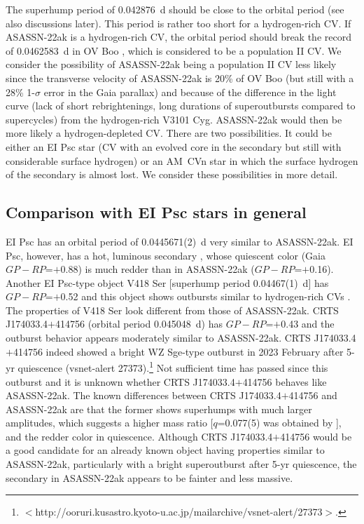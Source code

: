 \documentclass{article}
\begin{document}
   The superhump period of 0.042876~d should be close to
the orbital period (see also discussions later).
This period is rather too short for a hydrogen-rich CV.
If ASASSN-22ak is a hydrogen-rich CV,
the orbital period should break the record of 0.0462583~d
in OV Boo \citep{lit07j1507,pat08j1507,uth11j1507,ohn19ovboo},
which is considered to be a population II CV.
We consider the possibility of ASASSN-22ak being
a population II CV less likely since the transverse velocity
of ASASSN-22ak is 20\% of OV Boo \citep{GaiaDR3} (but still with
a 28\% 1-$\sigma$ error in the Gaia parallax) and because
of the difference in the light curve (lack of short rebrightenings,
long durations of superoutbursts compared to supercycles)
from the hydrogen-rich V3101 Cyg.
ASASSN-22ak would then be more likely a hydrogen-depleted CV.
There are two possibilities.  It could be either an EI Psc
star (CV with an evolved core in the secondary but still with
considerable surface hydrogen) or an AM~CVn star in which
the surface hydrogen of the secondary is almost lost.
We consider these possibilities in more detail.

\subsection{Comparison with EI Psc stars in general}\label{sec:eipsc}

   EI Psc has an orbital period of 0.0445671(2)~d \citep{tho02j2329}
very similar to ASASSN-22ak.  EI Psc, however, has a hot, luminous
secondary \citep{tho02j2329}, whose quiescent color
(Gaia $GP-RP$=$+$0.88) is much redder than in ASASSN-22ak
($GP-RP$=$+$0.16).  Another EI Psc-type object V418 Ser
[superhump period 0.04467(1)~d] has $GP-RP$=$+$0.52 and this object
shows outbursts similar to hydrogen-rich CVs
\citep{Pdot7,vog21suumacycle}.
The properties of V418 Ser look different from those of ASASSN-22ak.
CRTS J174033.4$+$414756 (orbital period 0.045048~d) has
$GP-RP$=$+$0.43 and the outburst behavior
\citep{Pdot5,Pdot7,cho15j1740,ima18j1740}
appears moderately similar to ASASSN-22ak.
CRTS J174033.4$+$414756 indeed showed a bright WZ Sge-type outburst
in 2023 February after 5-yr quiescence (vsnet-alert 27373).\footnote{
   $<$http://ooruri.kusastro.kyoto-u.ac.jp/mailarchive/vsnet-alert/27373$>$.
}  Not sufficient time has passed since this outburst and
it is unknown whether CRTS J174033.4$+$414756 behaves like
ASASSN-22ak.  The known differences between CRTS J174033.4$+$414756
and ASASSN-22ak are that the former shows superhumps with
much larger amplitudes, which suggests a higher mass ratio
[$q$=0.077(5) was obtained by \citep{ima18j1740}], and
the redder color in quiescence.  Although CRTS J174033.4$+$414756
would be a good candidate for an already known object having
properties similar to ASASSN-22ak, particularly with a bright
superoutburst after 5-yr quiescence, the secondary in ASASSN-22ak
appears to be fainter and less massive.
\end{document}
